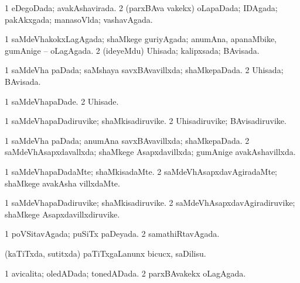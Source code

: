{{\bentry
{} 
\gl{\gu}
\expl{}
\bmng
\bnum
\num{1} eDegoDada; avakAshavirada. 
\num{2} (parxBAva \mo vakekx) oLapaDada; IDAgada; pakAkxgada; manasoVlda; vashavAgada. 
\enum
\emng
\eentry

\bentry
{} 
\gl{\gu}
\expl{}
\bmng
\bnum
\num{1} saMdeVhakokxLagAgada; shaMkege guriyAgada; anumAna, apanaMbike, gumAnige -- oLagAgada. 
\num{2} (ideyeMdu) Uhisada; kalipxsada; BAvisada. 
\enum
\emng
\eentry

\bentry
{} 
\gl{\gu}
\expl{}
\bmng
\bnum
\num{1} saMdeVha paDada; saMshaya savxBAvavillxda; shaMkepaDada. 
\num{2} Uhisada; BAvisada. 
\enum
\emng
\eentry

\bentry
{} 
\gl{\kirxvi}
\bmng
\bnum
\num{1} saMdeVhapaDade. 
\num{2} Uhisade. 
\enum
\emng
\eentry

\bentry
{} 
\gl{\nA}
\expl{}
\bmng
\bnum
\num{1} saMdeVhapaDadiruvike; shaMkisadiruvike. 
\num{2} Uhisadiruvike; BAvisadiruvike. 
\enum
\emng
\eentry

\bentry
{} 
\gl{\gu}
\expl{}
\bmng
\bnum
\num{1} saMdeVha paDada; anumAna savxBAvavillxda; shaMkepaDada. 
\num{2} saMdeVhAsapxdavallxda; shaMkege Asapxdavillxda; gumAnige avakAshavillxda. 
\enum
\emng
\eentry

\bentry
{} 
\gl{\kirxvi}
\bmng
\bnum
\num{1} saMdeVhapaDadaMte; shaMkisadaMte. 
\num{2} saMdeVhAsapxdavAgiradaMte; shaMkege avakAsha villxdaMte. 
\enum
\emng
\eentry

\bentry
{} 
\gl{\nA}
\expl{}
\bmng
\bnum
\num{1} saMdeVhapaDadiruvike; shaMkisadiruvike. 
\num{2} saMdeVhAsapxdavAgiradiruvike; shaMkege Asapxdavillxdiruvike. 
\enum
\emng
\eentry

\bentry
{} 
\gl{\gu}
\expl{}
\bmng
\bnum
\num{1} poVSitavAgada; puSiTx paDeyada. 
\num{2} samathiRtavAgada. 
\enum
\emng
\eentry

\bentry
{} 
\gl{\sakirx}
\expl{}
\bmng
(kaTiTxda, sutitxda) paTiTxgaLanunx bicucx, saDilisu. 
\emng
\eentry

\bentry
{} 
\gl{\gu}
\expl{}
\bmng
\bnum
\num{1} avicalita; oledADada; tonedADada. 
\num{2} parxBAvakekx oLagAgada. 
\enum
\emng
\eentry

}}
